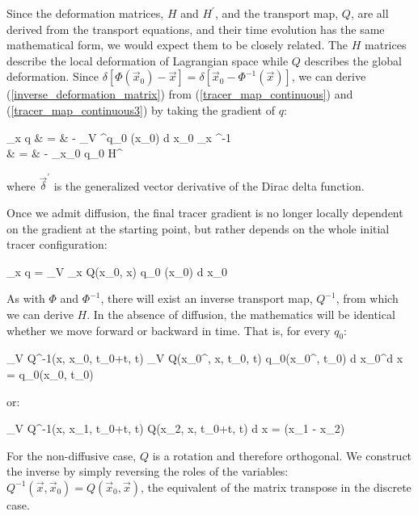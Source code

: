 Since the deformation matrices,
$H$ and $H^\prime$, and the transport map, $Q$, are all derived from the
transport equations, and their time evolution has the same mathematical form,
we would expect them to be closely related. 
The $H$ matrices describe the local deformation of Lagrangian space 
while $Q$ describes the global deformation.
Since $\delta \left [\Phi(\vec x_0) - \vec x \right ]=\delta \left [\vec x_0 - \Phi^{-1}(\vec x) \right ]$,
we can derive (\ref{inverse_deformation_matrix}) from
(\ref{tracer_map_continuous}) and (\ref{tracer_map_continuous3}) by taking 
the gradient of $q$:
\begin{eqanl}
	\nabla_{\vec x} q & = & - \int_V \vec \delta^\prime {} q_0 (\vec x_0) 
	\mathrm d \vec x_0 \cdot \nabla_{\vec x} \Phi^{-1} \\
	& = & - \nabla_{\vec x_0} q_0 \cdot H^\prime
\end{eqanl}
where $\vec \delta^\prime$ is the generalized vector derivative of the 
Dirac delta function.

Once we admit diffusion, the final tracer gradient is no longer locally 
dependent on the gradient at the starting point, but rather depends on the
whole initial tracer configuration:
\begin{eqnl}
	\nabla_{\vec x} q = \int_V \nabla_{\vec x} Q(\vec x_0, \vec x) q_0 (\vec x_0) \mathrm d \vec x_0
\end{eqnl}

As with $\Phi$ and $\Phi^{-1}$, 
there will exist an inverse transport map, $Q^{-1}$, from which we can derive
$H$. In the absence of diffusion, the mathematics will be identical whether
we move forward or backward in time.
That is, for every $q_0$:
\begin{eqnl}
	\int_V Q^{-1}(\vec x, \vec x_0, t_0+\Delta t, \Delta t) 
	\int_V Q(\vec x_0^\prime, \vec x, t_0, \Delta t) 
	q_0(\vec x_0^\prime, t_0) 
	\mathrm d \vec x_0^\prime \mathrm d \vec x = q_0(\vec x_0, t_0)
\end{eqnl}
or:
\begin{eqanl}
	\int_V  Q^{-1}(\vec x, \vec x_1, t_0+\Delta t, \Delta t) Q(\vec x_2, \vec x, t_0+\Delta t, \Delta t) \mathrm d \vec x = \delta(\vec x_1 - \vec x_2)
\end{eqanl}
For the non-diffusive case, $Q$ is a rotation and therefore orthogonal.
We construct the inverse by simply reversing the roles of the variables:
$Q^{-1}(\vec x, \vec x_0) = Q(\vec x_0, \vec x)$, 
the equivalent of the matrix transpose in the discrete case.

